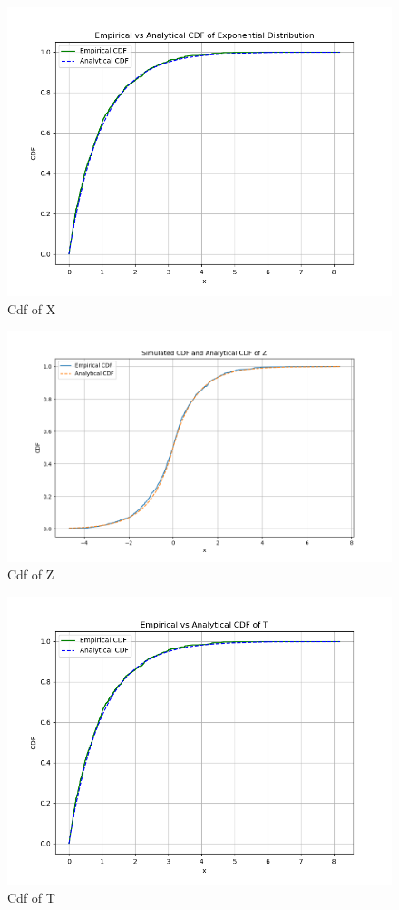 \documentclass[journal,12pt,twocolumn]{IEEEtran}
\begin{document}
\begin{figure}[ht]
\includegraphics[width=\columnwidth]{./figs/Figure_11.png}
\caption{Cdf of X}
\label{fig:2023/ST/61/4}
\end{figure}
\begin{figure}[ht]
\includegraphics[width=\columnwidth]{./figs/Figure_12.png}
\caption{Cdf of Z}
\label{fig:2023/ST/61/5}
\end{figure}
\begin{figure}[ht]
\includegraphics[width=\columnwidth]{./figs/Figure_13.png}
\caption{Cdf of T}
\label{fig:2023/ST/61/6}
\end{figure}
\end{document}
